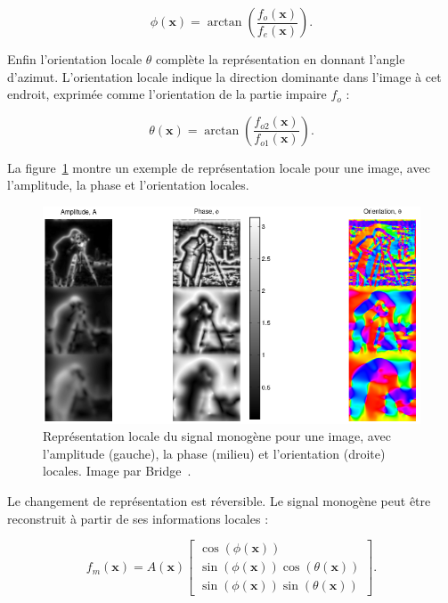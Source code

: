 \begin{equation}
    \phi(\mathbf{x}) = \arctan\left(\frac{f_o(\mathbf{x})}{f_e(\mathbf{x})}\right).
\end{equation}

Enfin l'orientation locale $\theta$ complète la représentation en donnant l'angle d'azimut. L'orientation locale indique la direction dominante dans l'image à cet endroit, exprimée comme l'orientation de la partie impaire $f_o$ :

\begin{equation}
    \theta(\mathbf{x}) = \arctan\left(\frac{f_{o2}(\mathbf{x})}{f_{o1}(\mathbf{x})}\right).
\end{equation}

La figure~\ref{fig:monogenic-local-representation} montre un exemple de représentation locale pour une image, avec l'amplitude, la phase et l'orientation locales.

\bigskip

\begin{figure}
    \centering
    \includegraphics[width=\textwidth]{contenu/resources/images/local_information_monogenic}
    \caption[Représentation locale du signal monogène]{Représentation locale du signal monogène pour une image, avec l'amplitude (gauche), la phase (milieu) et l'orientation (droite) locales. Image par Bridge~\cite{bridge_introduction_2018}.}
    \label{fig:monogenic-local-representation}
\end{figure}

Le changement de représentation est réversible. Le signal monogène peut être reconstruit à partir de ses informations locales :

\begin{equation}
    f_m(\mathbf{x}) = A(\mathbf{x})\left[
        \begin{array}{c}
        \cos(\phi(\mathbf{x})) \\
        \sin(\phi(\mathbf{x}))\cos(\theta(\mathbf{x})) \\
        \sin(\phi(\mathbf{x}))\sin(\theta(\mathbf{x}))
        \end{array}
    \right].
\end{equation}

